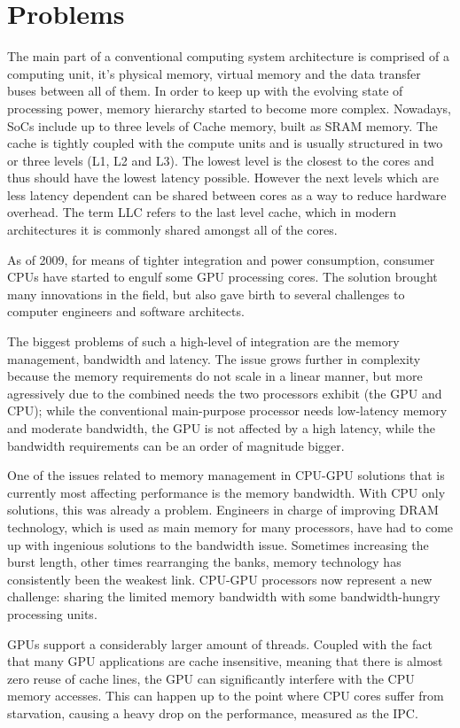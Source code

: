 \documentclass[12pt,journal,compsoc]{IEEEtran}
\begin{document}
\section{Problems}
The main part of a conventional computing system architecture is comprised of a computing unit, it's physical memory, virtual memory and the data transfer buses between all of them. In order to keep up with the evolving state of processing power, memory hierarchy started to become more complex. Nowadays, SoCs include up to three levels of Cache memory, built as SRAM memory. The cache is tightly coupled with the compute units and is usually structured in two or three levels (L1, L2 and L3). The lowest level is the closest to the cores and thus should have the lowest latency possible. However the next levels which are less latency dependent can be shared between cores as a way to reduce hardware overhead. The term LLC refers to the last level cache, which in modern architectures it is commonly shared amongst all of the cores.

As of 2009, for means of tighter integration and power consumption, consumer CPUs have started to engulf some GPU processing cores. The solution brought many innovations in the field, but also gave birth to several challenges to computer engineers and software architects. 

The biggest problems of such a high-level of integration are the memory management, bandwidth and latency. The issue grows further in complexity because the memory requirements do not scale in a linear manner, but more agressively due to the combined needs the two processors exhibit (the GPU and CPU); while the conventional main-purpose processor needs low-latency memory and moderate bandwidth, the GPU is not affected by a high latency, while the bandwidth requirements can be an order of magnitude bigger.

One of the issues related to memory management in CPU-GPU solutions that is currently most affecting performance is the memory bandwidth. With CPU only solutions, this was already a problem. Engineers in charge of improving DRAM technology, which is used as main memory for many processors, have had to come up with ingenious solutions to the bandwidth issue. Sometimes increasing the burst length, other times rearranging the banks, memory technology has consistently been the weakest link. CPU-GPU processors now represent a new challenge: sharing the limited memory bandwidth with some bandwidth-hungry processing units.

GPUs support a considerably larger amount of threads. Coupled with the fact that many GPU applications are cache insensitive, meaning that there is almost zero reuse of cache lines, the GPU can significantly interfere with the CPU memory accesses. This can happen up to the point where CPU cores suffer from starvation, causing a heavy drop on the performance, measured as the IPC.
\end{document}
